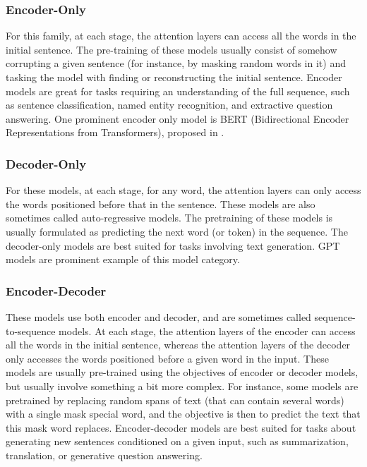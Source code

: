 \documentclass[conference]{IEEEtran}
\begin{document}
\subsubsection{\textbf{Encoder-Only}} 
For this family, at each stage, the attention layers can access all the words in the initial sentence. The pre-training of these models usually consist of somehow corrupting a given sentence (for instance, by masking random words in it) and tasking the model with finding or reconstructing the initial sentence. Encoder models are great for tasks requiring an understanding of the full sequence, such as sentence classification, named entity recognition, and extractive question answering.
One prominent encoder only model is BERT (Bidirectional Encoder Representations from Transformers), proposed in \cite{devlin2018bert}.


\subsubsection{\textbf{Decoder-Only}} 
For these models, at each stage, for any word, the attention layers can only access the words positioned before that in the sentence. These models are also sometimes called auto-regressive models.
The pretraining of these models is usually formulated as predicting the next word (or token) in the sequence. The decoder-only models are best suited for tasks involving text generation. GPT models are prominent example of this model category.


\subsubsection{\textbf{Encoder-Decoder}}
These models use both encoder and decoder, and are sometimes called sequence-to-sequence models.  At each stage, the attention layers of the encoder can access all the words in the initial sentence, whereas the attention layers of the decoder only accesses the words positioned before a given word in the input.
These models are usually pre-trained using the objectives of encoder or decoder models, but usually involve something a bit more complex. For instance, some models are pretrained by replacing random spans of text (that can contain several words) with a single mask special word, and the objective is then to predict the text that this mask word replaces.
Encoder-decoder models are best suited for tasks about generating new sentences conditioned on a given input, such as summarization, translation, or generative question answering.
\end{document}

